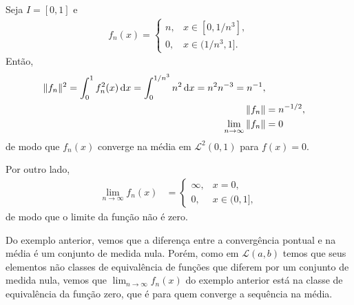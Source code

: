 \begin{exem}
    Seja $I = [0,1]$ e
    \begin{align*}
        f_n(x) = \begin{cases}
            n, & x \in [0, 1/n^3], \\
            0, & x \in (1/n^3, 1].
        \end{cases}
    \end{align*}
    Ent\~{a}o,
    \begin{align*}
        \| f_n \|^2 = \int_0^1 f_n^2(x) \, \mathrm{d}x = \int_0^{1/n^3} n^2 \, \mathrm{d}x = n^2 n^{-3} = n^{-1}, \\
        \| f_n \| &= n^{-1/2}, \\
        \lim_{n \to \infty} \| f_n \| &= 0
    \end{align*}
    de modo que $f_n(x)$ converge na m\'{e}dia em $\mathcal{L}^2(0,1)$ para $f(x) = 0$.

    Por outro lado,
    \begin{align*}
        \lim_{n \to \infty} f_n(x) &= \begin{cases}
            \infty, & x = 0, \\
            0, & x \in (0,1],
        \end{cases}
    \end{align*}
    de modo que o limite da fun\c{c}\~{a}o n\~{a}o \'{e} zero.
\end{exem}

\begin{obs}
    Do exemplo anterior, vemos que a diferen\c{c}a entre a converg\^{e}ncia pontual e na m\'{e}dia \'{e} um conjunto de medida nula. Por\'{e}m, como em $\mathcal{L}(a,b)$ temos que seus elementos n\~{a}o classes de equival\^{e}ncia de fun\c{c}\~{o}es que diferem por um conjunto de medida nula, vemos que $\lim_{n \to \infty} f_n(x)$ do exemplo anterior est\'{a} na classe de equival\^{e}ncia da fun\c{c}\~{a}o zero, que \'{e} para quem converge a sequ\^{e}ncia na m\'{e}dia.
\end{obs}

